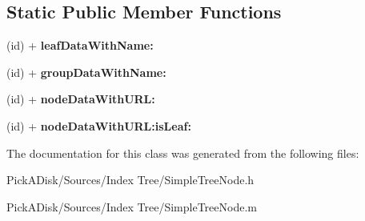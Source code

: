 \subsection*{Static Public Member Functions}
\begin{DoxyCompactItemize}
\item 
\hypertarget{interface_simple_node_data_a27a70662180f2be54ffd5ee4293b78d7}{
(id) + {\bfseries leafDataWithName:}}
\label{interface_simple_node_data_a27a70662180f2be54ffd5ee4293b78d7}

\item 
\hypertarget{interface_simple_node_data_a723aabf69386c4e53a01302a165a1922}{
(id) + {\bfseries groupDataWithName:}}
\label{interface_simple_node_data_a723aabf69386c4e53a01302a165a1922}

\item 
\hypertarget{interface_simple_node_data_a4853f2de7c70d619c9cca00a6b8f29ba}{
(id) + {\bfseries nodeDataWithURL:}}
\label{interface_simple_node_data_a4853f2de7c70d619c9cca00a6b8f29ba}

\item 
\hypertarget{interface_simple_node_data_a7ca520ed6db620a9ce28a1d9f3f9e794}{
(id) + {\bfseries nodeDataWithURL:isLeaf:}}
\label{interface_simple_node_data_a7ca520ed6db620a9ce28a1d9f3f9e794}

\end{DoxyCompactItemize}


The documentation for this class was generated from the following files:\begin{DoxyCompactItemize}
\item 
PickADisk/Sources/Index Tree/SimpleTreeNode.h\item 
PickADisk/Sources/Index Tree/SimpleTreeNode.m\end{DoxyCompactItemize}
